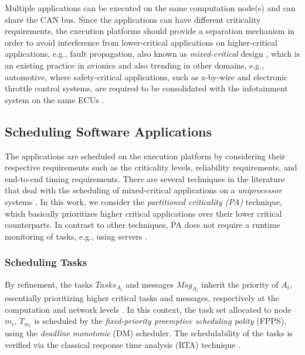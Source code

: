 Multiple applications can be executed on the same computation node(s) and can share the CAN bus. Since the applications can have different criticality requirements, the execution platforms should provide a separation mechanism in order to avoid interference from lower-critical applications on higher-critical applications, e.g., fault propagation, also known as   \textit{mixed-critical} design \cite{Vestal2007PreemptiveAssurance}, which is an existing practice in avionics and also trending in other domains, e.g., automotive, where  safety-critical applications, such as x-by-wire and electronic throttle control systems, are required to be consolidated with the infotainment system on the same ECUs \cite{bibid}.

\subsection{Scheduling Software Applications}
The applications are scheduled on the execution platform by considering their respective requirements such as the criticality levels, reliability requirements, and end-to-end timing requirements. There are several techniques in the literature that deal with the scheduling of mixed-critical applications on a \textit{uniprocessor} systems \cite{Vestal2007PreemptiveAssurance}. In this work, we consider the \textit{partitioned criticality (PA)}  technique, which basically prioritizes higher critical applications over their lower critical counterparts. In contrast to other techniques, PA does not require a runtime monitoring of tasks, e.g., using servers \cite{AbeniIntegratingSystems,Ashjaei2017DesigningSystems,Inam2014ThePlatforms}.

\subsubsection{Scheduling Tasks}\label{subsec_responsetimeanalysis}
By refinement, the tasks $Tasks_{A_i}$ and messages $Msg_{A_i}$ inherit the priority of $A_i$, essentially prioritizing higher critical tasks and messages, respectively at the computation and network levels \cite{Baruah2011Response-timeSystems,Burns2013MixedNetwork}. In this context, the task set allocated to node $m_i$, $T_{m_i}$ is scheduled by the \textit{fixed-priority preemptive scheduling polity} (FPPS), using the \textit{deadline monotonic} (DM) scheduler. The schedulability of the tasks is verified via the classical response time analysis (RTA) technique \cite{Baruah2011Response-timeSystems}. 

